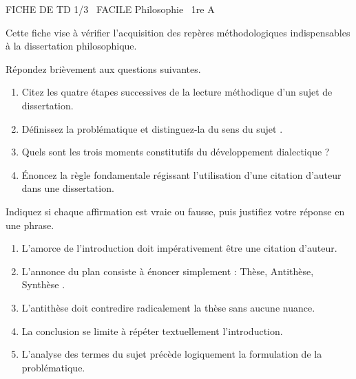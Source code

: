 \documentclass[11pt]{article}
\begin{document}
\begin{tcolorbox}[enhanced,colback=popink,colframe=popink,arc=10pt,boxrule=0pt,left=12pt,right=12pt,top=9pt,bottom=9pt]
{\color{white}\popxbold\small FICHE DE TD 1/3 \textbullet\ FACILE \hfill Philosophie \textbullet\ 1re A\par}
\end{tcolorbox}
\vspace{4pt}
Cette fiche vise à vérifier l'acquisition des repères méthodologiques indispensables à la dissertation philosophique.

\begin{exercice}
Répondez brièvement aux questions suivantes.
\begin{enumerate}
    \item Citez les quatre étapes successives de la lecture méthodique d'un sujet de dissertation.
    \item Définissez la \og problématique \fg{} et distinguez-la du \og sens du sujet \fg.
    \item Quels sont les trois moments constitutifs du développement dialectique ?
    \item Énoncez la règle fondamentale régissant l'utilisation d'une citation d'auteur dans une dissertation.
\end{enumerate}
\end{exercice}

\begin{exercice}
Indiquez si chaque affirmation est vraie ou fausse, puis justifiez votre réponse en une phrase.
\begin{enumerate}
    \item L'amorce de l'introduction doit impérativement être une citation d'auteur.
    \item L'annonce du plan consiste à énoncer simplement : \og Thèse, Antithèse, Synthèse \fg.
    \item L'antithèse doit contredire radicalement la thèse sans aucune nuance.
    \item La conclusion se limite à répéter textuellement l'introduction.
    \item L'analyse des termes du sujet précède logiquement la formulation de la problématique.
\end{enumerate}
\end{exercice}
\end{document}

